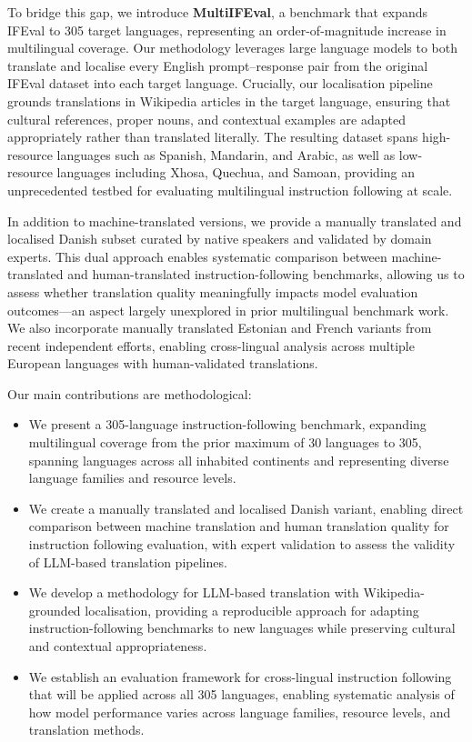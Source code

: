\documentclass[11pt]{article}
\begin{document}
To bridge this gap, we introduce \textbf{MultiIFEval}, a benchmark that expands IFEval
to 305 target languages, representing an order-of-magnitude increase in multilingual
coverage. Our methodology leverages large language models to both translate and localise
every English prompt–response pair from the original IFEval dataset into each target
language. Crucially, our localisation pipeline grounds translations in Wikipedia
articles in the target language, ensuring that cultural references, proper nouns, and
contextual examples are adapted appropriately rather than translated literally. The
resulting dataset spans high-resource languages such as Spanish, Mandarin, and Arabic,
as well as low-resource languages including Xhosa, Quechua, and Samoan, providing an
unprecedented testbed for evaluating multilingual instruction following at scale.

In addition to machine-translated versions, we provide a manually translated and
localised Danish subset curated by native speakers and validated by domain experts. This
dual approach enables systematic comparison between machine-translated and
human-translated instruction-following benchmarks, allowing us to assess whether
translation quality meaningfully impacts model evaluation outcomes—an aspect largely
unexplored in prior multilingual benchmark work. We also incorporate manually translated
Estonian \cite{dorkin2025ifeval-et} and French \cite{alhajar2024ifeval-fr} variants
from recent independent efforts, enabling cross-lingual analysis across multiple
European languages with human-validated translations.

Our main contributions are methodological:

\begin{itemize}
\item We present a 305-language instruction-following benchmark, expanding multilingual
  coverage from the prior maximum of 30 languages to 305, spanning languages across all
  inhabited continents and representing diverse language families and resource levels.

\item We create a manually translated and localised Danish variant, enabling direct
  comparison between machine translation and human translation quality for instruction
  following evaluation, with expert validation to assess the validity of
  LLM-based translation pipelines.

\item We develop a methodology for LLM-based translation with Wikipedia-grounded
  localisation, providing a reproducible approach for adapting instruction-following
  benchmarks to new languages while preserving cultural and contextual appropriateness.

\item We establish an evaluation framework for cross-lingual instruction following that
  will be applied across all 305 languages, enabling systematic analysis of how model
  performance varies across language families, resource levels, and translation methods.
\end{itemize}
\end{document}
